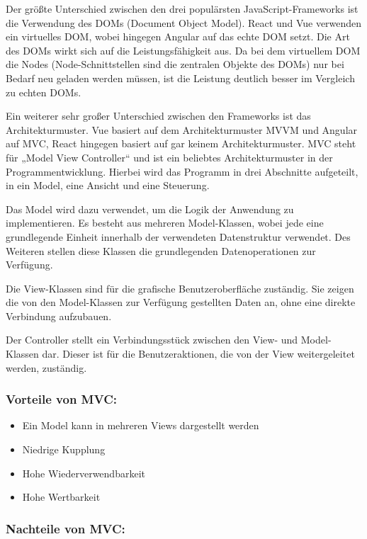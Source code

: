 Der größte Unterschied zwischen den drei populärsten JavaScript-Frameworks ist die Verwendung des DOMs (Document Object Model). React und Vue verwenden ein virtuelles DOM, wobei hingegen Angular auf das echte DOM setzt. Die Art des DOMs wirkt sich auf die Leistungsfähigkeit aus. Da bei dem virtuellem DOM die Nodes (Node-Schnittstellen sind die zentralen Objekte des DOMs) nur bei Bedarf neu geladen werden müssen, ist die Leistung deutlich besser im Vergleich zu echten DOMs.

Ein weiterer sehr großer Unterschied zwischen den Frameworks ist das Architekturmuster. Vue basiert auf dem Architekturmuster MVVM und Angular auf MVC, React hingegen basiert auf gar keinem Architekturmuster.
MVC steht für „Model View Controller“ und ist ein beliebtes Architekturmuster in der Programmentwicklung. Hierbei wird das Programm in drei Abschnitte aufgeteilt, in ein Model, eine Ansicht und eine Steuerung.

Das Model wird dazu verwendet, um die Logik der Anwendung zu implementieren. Es besteht aus mehreren Model-Klassen, wobei jede eine grundlegende Einheit innerhalb der verwendeten Datenstruktur verwendet. Des Weiteren stellen diese Klassen die grundlegenden Datenoperationen zur Verfügung.

Die View-Klassen sind für die grafische Benutzeroberfläche zuständig. Sie zeigen die von den Model-Klassen zur Verfügung gestellten Daten an, ohne eine direkte Verbindung aufzubauen.

Der Controller stellt ein Verbindungsstück zwischen den View- und Model-Klassen dar. Dieser ist für die Benutzeraktionen, die von der View weitergeleitet werden, zuständig.

\subsubsection{Vorteile von MVC:}

\begin{itemize}
  \item Ein Model kann in mehreren Views dargestellt werden
  \item Niedrige Kupplung
  \item Hohe Wiederverwendbarkeit
  \item Hohe Wertbarkeit
\end{itemize}

\subsubsection{Nachteile von MVC:}

